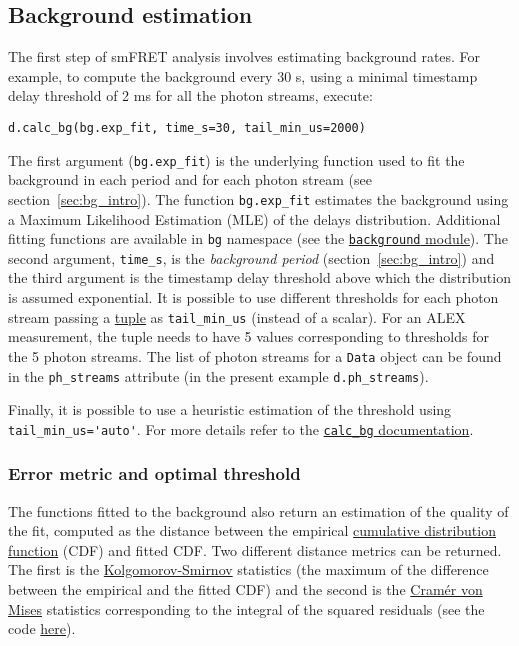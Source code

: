 \subsection{Background estimation}
\label{sec:bg_calc}

The first step of smFRET analysis involves estimating background rates.
For example, to compute the background every 30 s, using a minimal timestamp
delay threshold of 2 ms for all the photon streams, execute:

\begin{verbatim}
d.calc_bg(bg.exp_fit, time_s=30, tail_min_us=2000)
\end{verbatim}

The first argument (\verb|bg.exp_fit|) is the underlying function used to fit the
background in each period and for each photon stream (see section~\ref{sec:bg_intro}).
The function
\verb|bg.exp_fit| estimates the background using a Maximum Likelihood Estimation
(MLE) of the delays distribution. Additional fitting functions are available in
\verb|bg| namespace (see the
\href{http://fretbursts.readthedocs.org/en/latest/background.html}
{\texttt{background} module}). The second argument, \verb|time_s|, is the
\textit{background period} (section~\ref{sec:bg_intro}) and the third argument
is the timestamp delay threshold above which the distribution is assumed exponential.
It is possible to use different thresholds
for each photon stream passing a
\href{https://docs.python.org/2/tutorial/datastructures.html#tuples-and-sequences}{tuple}
as \verb|tail_min_us| (instead of a scalar).
For an ALEX measurement, the tuple needs to have 5 values
corresponding to thresholds for the 5 photon streams. The list of photon
streams for a \verb|Data| object can be found in the \verb|ph_streams|
attribute (in the present example \verb|d.ph_streams|).

Finally, it is possible to use a heuristic estimation of the threshold using
\verb|tail_min_us='auto'|. For more details refer to the
\href{http://fretbursts.readthedocs.org/en/latest/data\_class.html#fretbursts.burstlib.Data.calc\_bg}{\texttt{calc\_bg} documentation}.

\subsubsection{Error metric and optimal threshold}

The functions fitted to the background also return an estimation of the
quality of the fit, computed as the distance between the empirical
\href{http://en.wikipedia.org/wiki/Cumulative\_distribution\_function}{cumulative distribution function}
(CDF) and fitted CDF. Two different distance metrics can be returned.
The first is the
\href{http://en.wikipedia.org/wiki/Kolmogorov\%E2\%80\%93Smirnov\_test}{Kolgomorov-Smirnov}
statistics (the maximum of the difference between the empirical and the
fitted CDF) and the second is the
\href{http://en.wikipedia.org/wiki/Cram\%C3\%A9r\%E2\%80\%93von\_Mises\_criterion}{Cramér von Mises}
statistics corresponding to the integral of the squared residuals
(see the code
\href{https://github.com/tritemio/FRETBursts/blob/master/fretbursts/background.py#L41}{here}).

